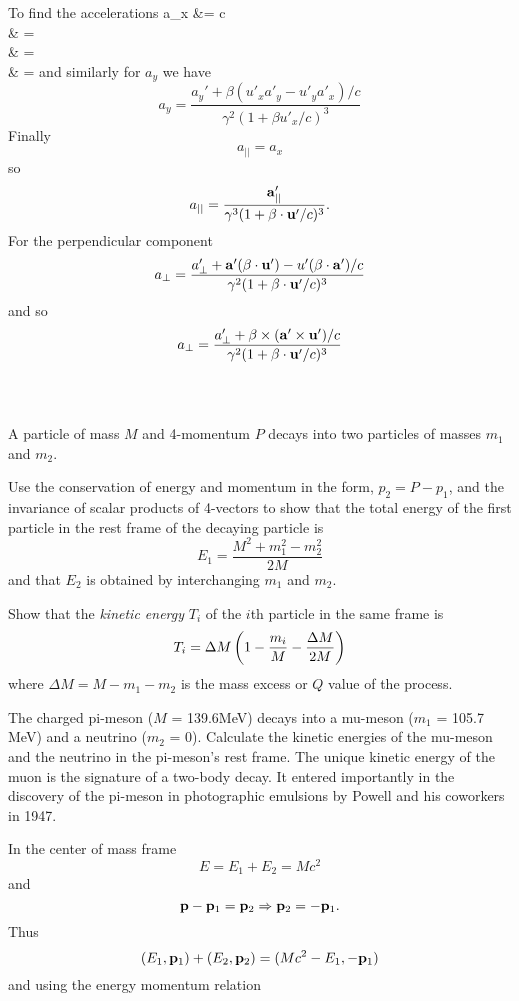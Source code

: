 \documentclass[10pt,letterpaper]{article}
\begin{document}
To find the accelerations 
\ba
	a_x &= c\\
	& =  \\
	& = \\
	& = 
\ea
and similarly for $a_y$ we have
\[
	a_y = \frac{a_y'+\beta(u'_xa'_y-u'_ya'_x)/c}{\gamma^2(1+\beta u'_x/c)^3}
\]
Finally
\[
	a_{||} = a_x
\]
so
\[
	a_{||} = \frac{\mathbf{a}'_{||}}{\gamma^3(1+\mathbf{\beta} \cdot \mathbf{u}'/c)^3}.
\]
For the perpendicular component
\[
	a_\perp = \frac{a'_\perp +\mathbf{a}'(\mathbf{\beta} \cdot \mathbf{u}')-u'(\mathbf{\beta} \cdot \mathbf{a}')/c}{
	\gamma^2(1+\mathbf{\beta} \cdot\mathbf{u}'/c)^3}
\]
and so
\[
	a_\perp = \frac{a_\perp'+\mathbf{\beta} \times (\mathbf{a}'\times \mathbf{u}')/c}{\gamma^2(1+\mathbf{\beta}\cdot \mathbf{u}'/c)^3}
\]
\\ \\
\item
A particle of mass $M$ and 4-momentum $P$ decays into two particles of masses $m_1$ and $m_2$.
\benum
\item
Use the conservation of energy and momentum in the form, $p_2 = P-p_1$, and the invariance of scalar
products of 4-vectors to show that the total energy of the first particle in the rest frame of the decaying particle
is 
\[
	E_1 = \frac{M^2+m_1^2-m_2^2}{2M}
\]
and that $E_2$ is obtained by interchanging $m_1$ and $m_2$.
\item
Show that the \emph{kinetic energy} $T_i$ of the $i$th particle in the same frame is 
\[
	T_i = \Delta M\left(1-\frac{m_i}{M}-\frac{\Delta M}{2M}\right)
\]
where $\Delta M = M-m_1-m_2$ is the mass excess or $Q$ value of the process.
\item
The charged pi-meson ($M$ = 139.6MeV) decays into a mu-meson ($m_1$ = 105.7 MeV) and a neutrino
($m_2$ = 0). Calculate the kinetic energies of the mu-meson and the neutrino in the pi-meson's rest frame.
The unique kinetic energy of the muon is the signature of a two-body decay. It entered importantly in the discovery
of the pi-meson in photographic emulsions by Powell and his coworkers in 1947.
\eenum
\benum
\item
In the center of mass frame
\[
	E = E_1+E_2 = Mc^2
\]
and
\[
	\mathbf{p}-\mathbf{p}_1 = \mathbf{p}_2 \Rightarrow \mathbf{p}_2 = -\mathbf{p}_1.
\]
Thus
\[
	(E_1,\mathbf{p}_1)+(E_2,\mathbf{p}_2) = (Mc^2-E_1,-\mathbf{p}_1)
\]
and using the energy momentum relation
\end{document}
